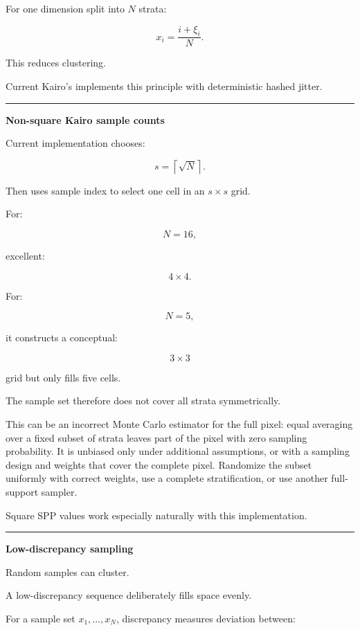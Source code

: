 For one dimension split into \(N\) strata:

\[
x_i=
\frac{i+\xi_i}{N}.
\]

This reduces clustering.

Current Kairo's  implements this principle with deterministic hashed jitter.

\begin{center}\rule{0.5\linewidth}{0.5pt}\end{center}

\textbf{Non-square Kairo sample counts}

Current implementation chooses:

\[
s=
\left\lceil\sqrt N\right\rceil.
\]

Then uses sample index to select one cell in an \(s\times s\) grid.

For:

\[
N=16,
\]

excellent:

\[
4\times4.
\]

For:

\[
N=5,
\]

it constructs a conceptual:

\[
3\times3
\]

grid but only fills five cells.

The sample set therefore does not cover all strata symmetrically.

This can be an incorrect Monte Carlo estimator for the full pixel: equal averaging over a fixed subset of strata leaves part of the pixel with zero sampling probability. It is unbiased only under additional assumptions, or with a sampling design and weights that cover the complete pixel. Randomize the subset uniformly with correct weights, use a complete stratification, or use another full-support sampler.

Square SPP values work especially naturally with this implementation.

\begin{center}\rule{0.5\linewidth}{0.5pt}\end{center}

\textbf{Low-discrepancy sampling}

Random samples can cluster.

A low-discrepancy sequence deliberately fills space evenly.

For a sample set \(x_1,\dots,x_N\), discrepancy measures deviation between:

